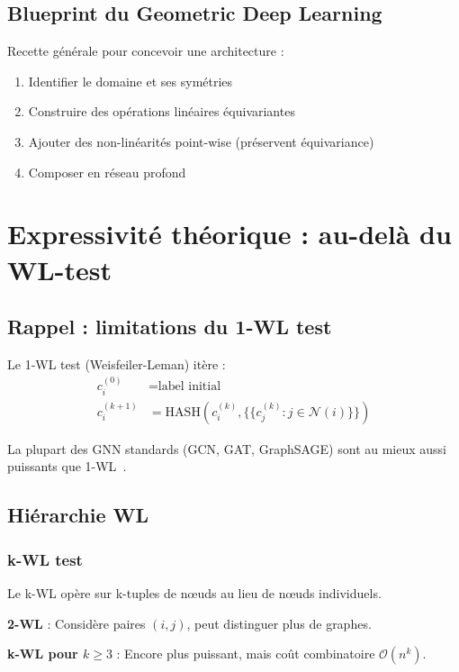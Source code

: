 \subsection{Blueprint du Geometric Deep Learning}

Recette générale pour concevoir une architecture :
\begin{enumerate}
    \item Identifier le domaine et ses symétries
    \item Construire des opérations linéaires équivariantes
    \item Ajouter des non-linéarités point-wise (préservent équivariance)
    \item Composer en réseau profond
\end{enumerate}

\section{Expressivité théorique : au-delà du WL-test}

\subsection{Rappel : limitations du 1-WL test}

Le 1-WL test (Weisfeiler-Leman) itère :
\begin{align*}
c_i^{(0)} &= \text{label initial} \\
c_i^{(k+1)} &= \text{HASH}\left(c_i^{(k)}, \{\!\!\{c_j^{(k)} : j \in \mathcal{N}(i)\}\!\!\}\right)
\end{align*}

La plupart des GNN standards (GCN, GAT, GraphSAGE) sont au mieux aussi puissants que 1-WL~\cite{Xu2019}.

\subsection{Hiérarchie WL}

\subsubsection{k-WL test}

Le k-WL opère sur k-tuples de nœuds au lieu de nœuds individuels.

\textbf{2-WL} : Considère paires $(i, j)$, peut distinguer plus de graphes.

\textbf{k-WL pour $k \geq 3$} : Encore plus puissant, mais coût combinatoire $\mathcal{O}(n^k)$.

